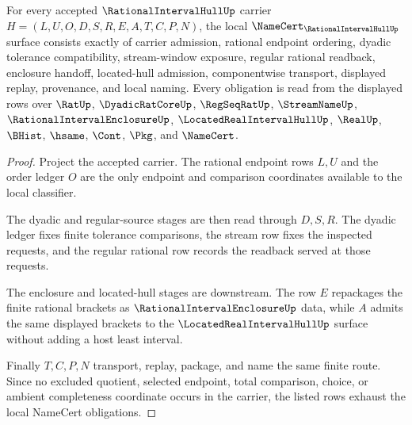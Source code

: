 \begin{theorem}
\label{thm:rational-interval-hull-namecert-obligations}
For every accepted $\RationalIntervalHullUp$ carrier $H=(L,U,O,D,S,R,E,A,T,C,P,N)$, the local $\NameCert_{\RationalIntervalHullUp}$ surface consists exactly of carrier admission, rational endpoint ordering, dyadic tolerance compatibility, stream-window exposure, regular rational readback, enclosure handoff, located-hull admission, componentwise transport, displayed replay, provenance, and local naming. Every obligation is read from the displayed rows over $\RatUp$, $\DyadicRatCoreUp$, $\RegSeqRatUp$, $\StreamNameUp$, $\RationalIntervalEnclosureUp$, $\LocatedRealIntervalHullUp$, $\RealUp$, $\BHist$, $\hsame$, $\Cont$, $\Pkg$, and $\NameCert$.
\end{theorem}
\begin{proof}
Project the accepted carrier. The rational endpoint rows $L,U$ and the order ledger $O$ are the only endpoint and comparison coordinates available to the local classifier.

The dyadic and regular-source stages are then read through $D,S,R$. The dyadic ledger fixes finite tolerance comparisons, the stream row fixes the inspected requests, and the regular rational row records the readback served at those requests.

The enclosure and located-hull stages are downstream. The row $E$ repackages the finite rational brackets as $\RationalIntervalEnclosureUp$ data, while $A$ admits the same displayed brackets to the $\LocatedRealIntervalHullUp$ surface without adding a host least interval.

Finally $T,C,P,N$ transport, replay, package, and name the same finite route. Since no excluded quotient, selected endpoint, total comparison, choice, or ambient completeness coordinate occurs in the carrier, the listed rows exhaust the local NameCert obligations.
\end{proof}

